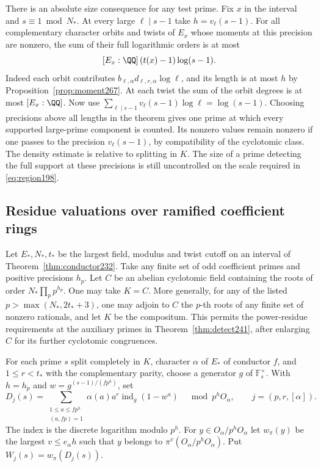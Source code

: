 \documentclass[a4paper,11pt]{article}
\theoremstyle{definition}
\theoremstyle{remark}
\numberwithin{equation}{section}
\begin{document}
There is an absolute size consequence for any test prime.
Fix \(x\) in the interval and \(s\equiv1\bmod N_*\). At
every large \(\ell\mid s-1\) take \(h=v_\ell(s-1)\).
For all complementary character orbits and twists of \(E_x\)
whose moments at this precision are nonzero, the sum of their
full logarithmic orders is at most
\[
                 [E_x:\QQ]\,(t(x)-1)\log(s-1).
\]
Indeed each orbit contributes \(b_{\ell,\alpha}d_{\ell,r,\alpha}
\log\ell\), and its length is at most \(h\) by
Proposition~\ref{prop:moment267}. At each twist the sum of the
orbit degrees is at most \([E_x:\QQ]\). Now use
\(\sum_{\ell\mid s-1}v_\ell(s-1)\log\ell=\log(s-1)\).
Choosing precisions above all lengths in the theorem gives
one prime at which every supported large-prime component is
counted. Its nonzero values remain nonzero if one passes to
the precision \(v_\ell(s-1)\), by compatibility of the
cyclotomic class. The density estimate is relative to splitting
in \(K\). The size of a prime detecting the full support at
these precisions is still uncontrolled on the scale required
in \eqref{eq:region198}.

\subsection{Residue valuations over ramified coefficient rings}\label{nav:II-55}
Let \(E_*,N_*,t_*\) be the largest field, modulus and twist
cutoff on an interval of Theorem~\ref{thm:conductor232}.
Take any finite set of odd coefficient primes and positive
precisions \(h_p\). Let \(C\) be an abelian cyclotomic field
containing the roots of order \(N_*\prod_p p^{h_p}\). One
may take \(K=C\). More generally, for any of the listed
\(p>\max(N_*,2t_*+3)\), one may adjoin to \(C\) the
\(p\)-th roots of any finite set of nonzero rationals,
and let \(K\) be the compositum. This permits the power-residue
requirements at the auxiliary primes in
Theorem~\ref{thm:detect241}, after enlarging \(C\) for its
further cyclotomic congruences.

For each prime \(s\) split completely in \(K\), character
\(\alpha\) of \(E_*\) of conductor \(f\), and
\(1\le r<t_*\) with the complementary parity, choose a
generator \(g\) of \(\mathbb F_s^\times\). With \(h=h_p\)
and \(w=g^{(s-1)/(fp^h)}\), set
\[
 D_j(s)=\sum_{\substack{1\le a\le fp^h\\(a,fp)=1}}
       \alpha(a)a^r\operatorname{ind}_g(1-w^a)
         \quad\bmod p^hO_\alpha,\qquad j=(p,r,[\alpha]).
\]
The index is the discrete logarithm modulo \(p^h\).
For \(y\in O_\alpha/p^hO_\alpha\) let \(w_\pi(y)\) be the
largest \(v\le e_\alpha h\) such that \(y\) belongs to
\(\pi^v(O_\alpha/p^hO_\alpha)\). Put \(W_j(s)=w_\pi(D_j(s))\).
\end{document}
